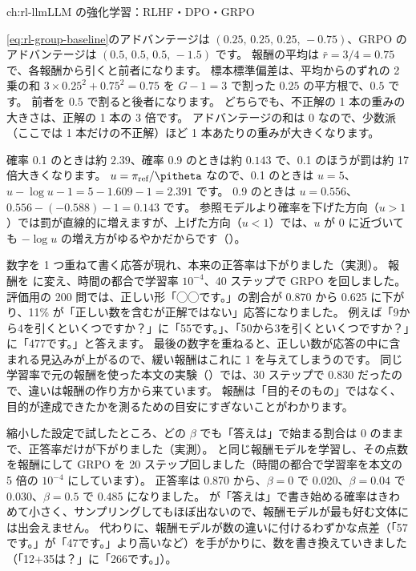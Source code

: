 \begin{answers}{ch:rl-llm}{LLM の強化学習：RLHF・DPO・GRPO}
\item \eqref{eq:rl-group-baseline}のアドバンテージは $(0.25,\,0.25,\,0.25,\,-0.75)$、GRPO のアドバンテージは $(0.5,\,0.5,\,0.5,\,-1.5)$ です。
報酬の平均は $\bar r=3/4=0.75$ で、各報酬から引くと前者になります。
標本標準偏差は、平均からのずれの 2 乗の和 $3\times0.25^2+0.75^2=0.75$ を $G-1=3$ で割った $0.25$ の平方根で、$0.5$ です。
前者を $0.5$ で割ると後者になります。
どちらでも、不正解の 1 本の重みの大きさは、正解の 1 本の 3 倍です。
アドバンテージの和は 0 なので、少数派（ここでは 1 本だけの不正解）ほど 1 本あたりの重みが大きくなります。
\item 確率 0.1 のときは約 $2.39$、確率 0.9 のときは約 $0.143$ で、0.1 のほうが罰は約 17 倍大きくなります。
$u=\pi_{\text{ref}}/\pitheta$ なので、0.1 のときは $u=5$、$u-\log u-1=5-1.609-1=2.391$ です。
0.9 のときは $u=0.556$、$0.556-(-0.588)-1=0.143$ です。
参照モデルより確率を下げた方向（$u>1$）では罰が直線的に増えますが、上げた方向（$u<1$）では、$u$ が 0 に近づいても $-\log u$ の増え方がゆるやかだからです（）。
\item 数字を 1 つ重ねて書く応答が現れ、本来の正答率は下がりました（実測）。
報酬を  に変え、時間の都合で学習率 $10^{-4}$、40 ステップで GRPO を回しました。
評価用の 200 問では、正しい形「◯◯です。」の割合が 0.870 から 0.625 に下がり、11\% が「正しい数を含むが正解ではない」応答になりました。
例えば「9から4を引くといくつですか？」に「55です。」、「50から3を引くといくつですか？」に「477です。」と答えます。
最後の数字を重ねると、正しい数が応答の中に含まれる見込みが上がるので、緩い報酬はこれに 1 を与えてしまうのです。
同じ学習率で元の報酬を使った本文の実験（）では、30 ステップで 0.830 だったので、違いは報酬の作り方から来ています。
報酬は「目的そのもの」ではなく、目的が達成できたかを測るための目安にすぎないことがわかります。
\item 縮小した設定で試したところ、どの $\beta$ でも「答えは」で始まる割合は 0 のままで、正答率だけが下がりました（実測）。
 と同じ報酬モデルを学習し、その点数を報酬にして GRPO を 20 ステップ回しました（時間の都合で学習率を本文の 5 倍の $10^{-4}$ にしています）。
正答率は 0.870 から、$\beta=0$ で 0.020、$\beta=0.04$ で 0.030、$\beta=0.5$ で 0.485 になりました。
 が「答えは」で書き始める確率はきわめて小さく、サンプリングしてもほぼ出ないので、報酬モデルが最も好む文体には出会えません。
代わりに、報酬モデルが数の違いに付けるわずかな点差（「57です。」が「47です。」より高いなど）を手がかりに、数を書き換えていきました（「12+35は？」に「266です。」）。

\end{answers}
